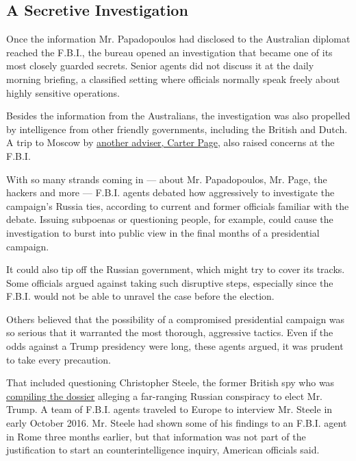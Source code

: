 \hypertarget{a-secretive-investigation}{%
\subsection{A Secretive Investigation}\label{a-secretive-investigation}}

Once the information Mr. Papadopoulos had disclosed to the Australian
diplomat reached the F.B.I., the bureau opened an investigation that
became one of its most closely guarded secrets. Senior agents did not
discuss it at the daily morning briefing, a classified setting where
officials normally speak freely about highly sensitive operations.

Besides the information from the Australians, the investigation was also
propelled by intelligence from other friendly governments, including the
British and Dutch. A trip to Moscow by
\href{https://www.nytimes3xbfgragh.onion/2017/12/18/magazine/what-if-anything-does-carter-page-know.html}{another
adviser, Carter Page}, also raised concerns at the F.B.I.

With so many strands coming in --- about Mr. Papadopoulos, Mr. Page, the
hackers and more --- F.B.I. agents debated how aggressively to
investigate the campaign's Russia ties, according to current and former
officials familiar with the debate. Issuing subpoenas or questioning
people, for example, could cause the investigation to burst into public
view in the final months of a presidential campaign.

It could also tip off the Russian government, which might try to cover
its tracks. Some officials argued against taking such disruptive steps,
especially since the F.B.I. would not be able to unravel the case before
the election.

Others believed that the possibility of a compromised presidential
campaign was so serious that it warranted the most thorough, aggressive
tactics. Even if the odds against a Trump presidency were long, these
agents argued, it was prudent to take every precaution.

That included questioning Christopher Steele, the former British spy who
was
\href{https://www.nytimes3xbfgragh.onion/2017/01/11/us/politics/donald-trump-russia-intelligence.html}{compiling
the dossier} alleging a far-ranging Russian conspiracy to elect Mr.
Trump. A team of F.B.I. agents traveled to Europe to interview Mr.
Steele in early October 2016. Mr. Steele had shown some of his findings
to an F.B.I. agent in Rome three months earlier, but that information
was not part of the justification to start an counterintelligence
inquiry, American officials said.

